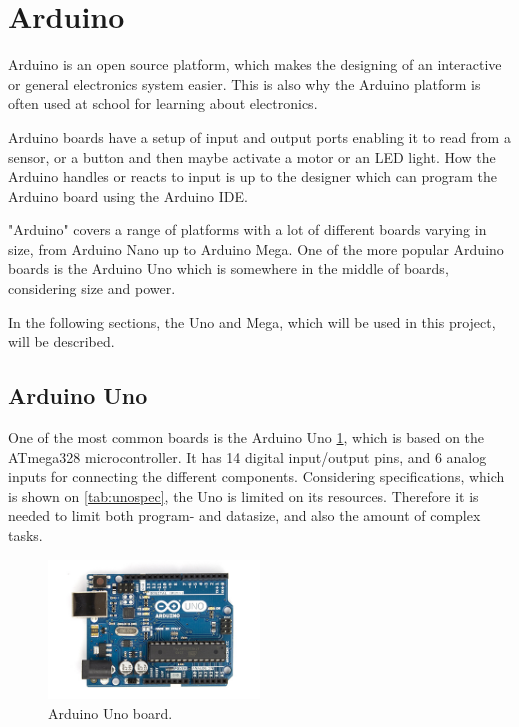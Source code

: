 \section{Arduino}
\label{sec:arduino}
Arduino is an open source platform, which makes the designing of an interactive or general electronics system easier. This is also why the Arduino platform is often used at school for learning about electronics.

Arduino boards have a setup of input and output ports enabling it to read from a sensor, or a button and then maybe activate a motor or an LED light. How the Arduino handles or reacts to input is up to the designer which can program the Arduino board using the Arduino IDE.

"Arduino" covers a range of platforms with a lot of different boards varying in size, from Arduino Nano up to Arduino Mega. One of the more popular Arduino boards is the Arduino Uno which is somewhere in the middle of boards, considering size and power.

In the following sections, the Uno and Mega, which will be used in this project, will be described.

\subsection{Arduino Uno}
One of the most common boards is the Arduino Uno \ref{fig:arduinouno}, which is based on the ATmega328 microcontroller. It has 14 digital input/output pins, and 6 analog inputs for connecting the different components. Considering specifications, which is shown on \ref{tab:unospec}, the Uno is limited on its resources. Therefore it is needed to limit both program- and datasize, and also the amount of complex tasks.
\begin{figure}[h!]
\centering
\includegraphics[width=0.5\textwidth]{chapters/analysis/figs/ArduinoUno.jpg}
\caption{Arduino Uno board\cite{arduinointroduction}.}
\label{fig:arduinouno}
\end{figure}

